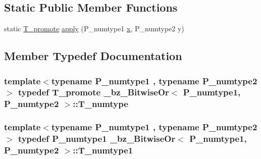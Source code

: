 \subsection*{Static Public Member Functions}
\begin{DoxyCompactItemize}
\item 
static \hyperlink{minmax_8h_aaa88a440c2f0d00798d5b1d42c79308d}{T\+\_\+promote} \hyperlink{class__bz__BitwiseOr_a63bf9ba0361b6825db0237c7ded4b190}{apply} (P\+\_\+numtype1 \hyperlink{vecnorm1_8cc_ac73eed9e41ec09d58f112f06c2d6cb63}{x}, P\+\_\+numtype2 y)
\end{DoxyCompactItemize}


\subsection{Member Typedef Documentation}
\hypertarget{class__bz__BitwiseOr_a41e97d82dbf703b56b9195f292423a49}{}
\subsubsection[{T\+\_\+numtype}]{\setlength{\rightskip}{0pt plus 5cm}template$<$typename P\+\_\+numtype1 , typename P\+\_\+numtype2 $>$ typedef {\bf T\+\_\+promote} {\bf \+\_\+bz\+\_\+\+Bitwise\+Or}$<$ P\+\_\+numtype1, P\+\_\+numtype2 $>$\+::{\bf T\+\_\+numtype}}\label{class__bz__BitwiseOr_a41e97d82dbf703b56b9195f292423a49}
\hypertarget{class__bz__BitwiseOr_ac6769776ff69e18eeeb02f3517826b07}{}
\subsubsection[{T\+\_\+numtype1}]{\setlength{\rightskip}{0pt plus 5cm}template$<$typename P\+\_\+numtype1 , typename P\+\_\+numtype2 $>$ typedef P\+\_\+numtype1 {\bf \+\_\+bz\+\_\+\+Bitwise\+Or}$<$ P\+\_\+numtype1, P\+\_\+numtype2 $>$\+::{\bf T\+\_\+numtype1}}\label{class__bz__BitwiseOr_ac6769776ff69e18eeeb02f3517826b07}
\hypertarget{class__bz__BitwiseOr_af866f1542575cb56448bb81cdda42465}{}
